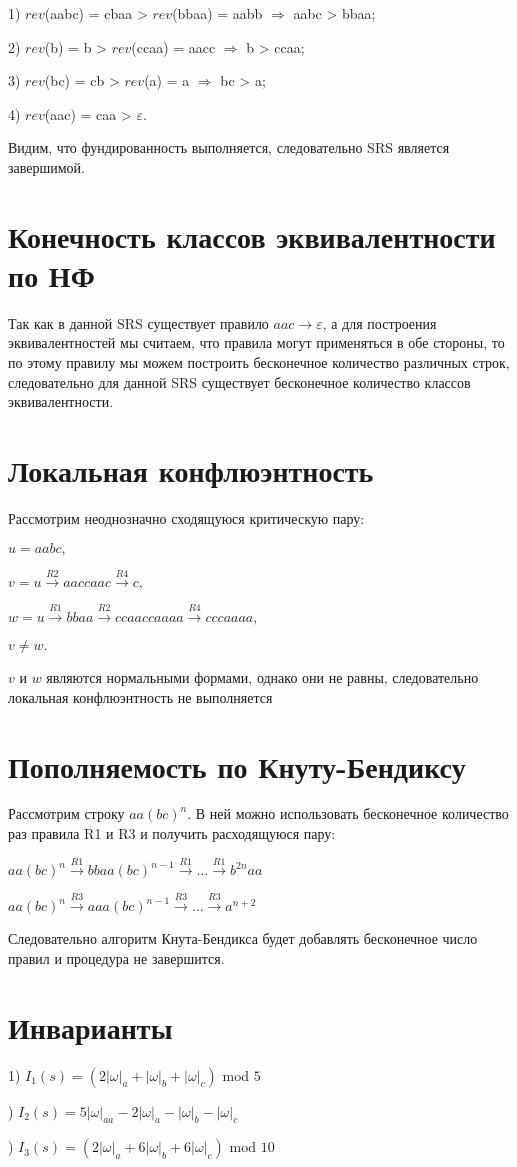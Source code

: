 \documentclass[12pt]{article}
\begin{document}
1) $rev$(aabc) = cbaa > $rev$(bbaa) = aabb $\Rightarrow$ aabc > bbaa;

2) $rev$(b) = b > $rev$(ccaa) = aacc $\Rightarrow$ b > ccaa;

3) $rev$(bc) = cb > $rev$(a) = a $\Rightarrow$ bc > a;

4) $rev$(aac) = caa > $\varepsilon$.

Видим, что фундированность выполняется, следовательно SRS является завершимой.

\section{Конечность классов эквивалентности по НФ}
Так как в данной SRS существует правило $aac \rightarrow \varepsilon$, а для построения эквивалентностей мы считаем, что правила могут применяться в обе стороны, то по этому правилу мы можем построить бесконечное количество различных строк, следовательно для данной SRS существует бесконечное количество классов эквивалентности.

\section{Локальная конфлюэнтность}

Рассмотрим неоднозначно сходящуюся критическую пару:

$u = aabc,$

$v = u \xrightarrow{R2} aaccaac \xrightarrow{R4} c,$ 

$w  = u\xrightarrow{R1} bbaa \xrightarrow{R2} ccaaccaaaa \xrightarrow{R4} cccaaaa,$

$v \neq w.$

$v$ и $w$ являются нормальными формами, однако они не равны, следовательно локальная конфлюэнтность не выполняется

\section{Пополняемость по Кнуту-Бендиксу}

\hspace{12px} Рассмотрим строку $aa(bc)^n$. В ней можно использовать бесконечное количество раз правила R1 и R3 и получить расходящуюся пару:

$aa(bc)^n \xrightarrow{R1} bbaa(bc)^{n-1} \xrightarrow{R1} \dots \xrightarrow{R1} b^{2n}aa$ 

$aa(bc)^n \xrightarrow{R3} aaa(bc)^{n-1} \xrightarrow{R3} \dots \xrightarrow{R3} a^{n+2}$

Следовательно алгоритм Кнута-Бендикса будет добавлять бесконечное число правил и процедура не завершится.

\section{Инварианты}

1) $I_1(s) = (2|\omega|_a + |\omega|_b + |\omega|_c) \text{ mod 5}$

) $I_2(s) = 5|\omega|_{aa} - 2|\omega|_a - |\omega|_b - |\omega|_c$

) $I_3(s) = (2|\omega|_a + 6|\omega|_b + 6|\omega|_c) \text{ mod 10}$
\end{document}
